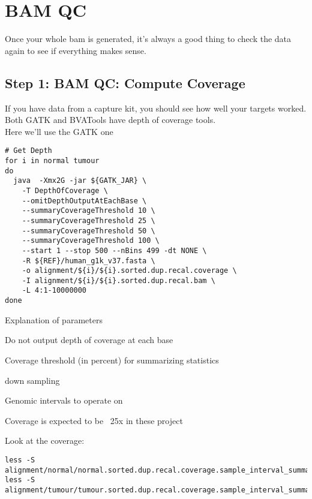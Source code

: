 \section{BAM QC}

Once your whole bam is generated, it's always a good thing to check the data again to see if everything makes sense.

\subsection{Step 1: BAM QC: Compute Coverage}
If you have data from a capture kit, you should see how well your targets worked. Both GATK and BVATools have depth of coverage tools. \\
Here we'll use the GATK one
\begin{lstlisting}
# Get Depth
for i in normal tumour
do
  java  -Xmx2G -jar ${GATK_JAR} \
    -T DepthOfCoverage \
    --omitDepthOutputAtEachBase \
    --summaryCoverageThreshold 10 \
    --summaryCoverageThreshold 25 \
    --summaryCoverageThreshold 50 \
    --summaryCoverageThreshold 100 \
    --start 1 --stop 500 --nBins 499 -dt NONE \
    -R ${REF}/human_g1k_v37.fasta \
    -o alignment/${i}/${i}.sorted.dup.recal.coverage \
    -I alignment/${i}/${i}.sorted.dup.recal.bam \
    -L 4:1-10000000
done
\end{lstlisting}
\begin{note}
Explanation of parameters
\begin{description}[style=multiline,labelindent=0cm,align=right,leftmargin=\descriptionlabelspace,rightmargin=1.5cm,font=\ttfamily]
 \item[--omitBaseOutput] Do not output depth of coverage at each base
 \item[--summaryCoverageThreshold] Coverage threshold (in percent) for summarizing statistics
 \item[-dt] down sampling
 \item[-L] Genomic intervals to operate on
\end{description}
\end{note}


Coverage is expected to be ~25x in these project

Look at the coverage:

\begin{lstlisting}
less -S alignment/normal/normal.sorted.dup.recal.coverage.sample_interval_summary
less -S alignment/tumour/tumour.sorted.dup.recal.coverage.sample_interval_summary
\end{lstlisting}

